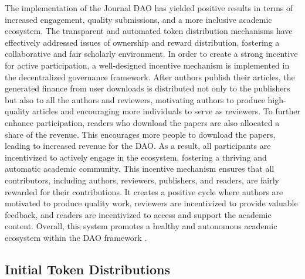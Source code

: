 \documentclass[lettersize,journal]{IEEEtran}
\begin{document}
The implementation of the Journal DAO has yielded positive results in terms of increased engagement, quality submissions, and a more inclusive academic ecosystem. The transparent and automated token distribution mechanisms have effectively addressed issues of ownership and reward distribution, fostering a collaborative and fair scholarly environment.
In order to create a strong incentive for active participation, a well-designed incentive mechanism is implemented in the decentralized governance framework. After authors publish their articles, the generated finance from user downloads is distributed not only to the publishers but also to all the authors and reviewers, motivating authors to produce high-quality articles and encouraging more individuals to serve as reviewers.
To further enhance participation, readers who download the papers are also allocated a share of the revenue. This encourages more people to download the papers, leading to increased revenue for the DAO. As a result, all participants are incentivized to actively engage in the ecosystem, fostering a thriving and automatic academic community.
This incentive mechanism ensures that all contributors, including authors, reviewers, publishers, and readers, are fairly rewarded for their contributions. It creates a positive cycle where authors are motivated to produce quality work, reviewers are incentivized to provide valuable feedback, and readers are incentivized to access and support the academic content. Overall, this system promotes a healthy and autonomous academic ecosystem within the DAO framework \cite{bolton1998corporate}.

\subsection{Initial Token Distributions}


\end{document}
